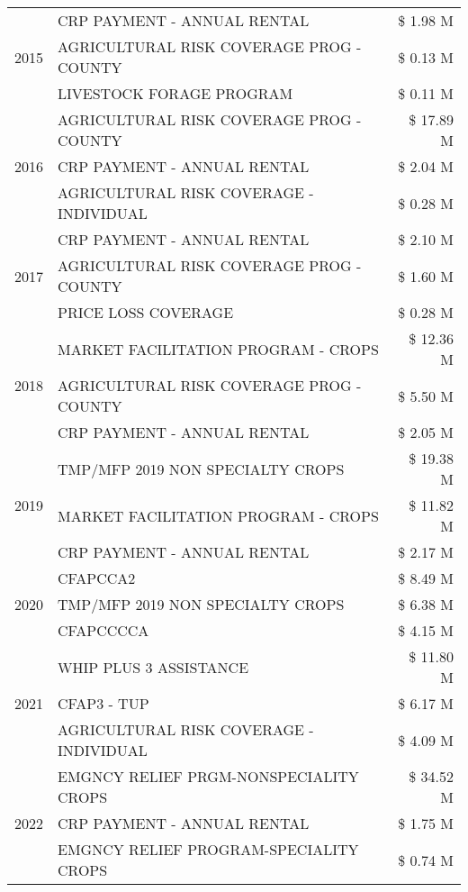 \begin{tabular}{llr}
\cline{1-3}
\multirow[t]{3}{*}{2015} & CRP PAYMENT - ANNUAL RENTAL & \$ 1.98 M \\
 & AGRICULTURAL RISK COVERAGE PROG - COUNTY & \$ 0.13 M \\
 & LIVESTOCK FORAGE PROGRAM & \$ 0.11 M \\
\cline{1-3}
\multirow[t]{3}{*}{2016} & AGRICULTURAL RISK COVERAGE PROG - COUNTY & \$ 17.89 M \\
 & CRP PAYMENT - ANNUAL RENTAL & \$ 2.04 M \\
 & AGRICULTURAL RISK COVERAGE - INDIVIDUAL & \$ 0.28 M \\
\cline{1-3}
\multirow[t]{3}{*}{2017} & CRP PAYMENT - ANNUAL RENTAL & \$ 2.10 M \\
 & AGRICULTURAL RISK COVERAGE PROG - COUNTY & \$ 1.60 M \\
 & PRICE LOSS COVERAGE & \$ 0.28 M \\
\cline{1-3}
\multirow[t]{3}{*}{2018} & MARKET FACILITATION PROGRAM - CROPS & \$ 12.36 M \\
 & AGRICULTURAL RISK COVERAGE PROG - COUNTY & \$ 5.50 M \\
 & CRP PAYMENT - ANNUAL RENTAL & \$ 2.05 M \\
\cline{1-3}
\multirow[t]{3}{*}{2019} & TMP/MFP 2019 NON SPECIALTY CROPS & \$ 19.38 M \\
 & MARKET FACILITATION PROGRAM - CROPS & \$ 11.82 M \\
 & CRP PAYMENT - ANNUAL RENTAL & \$ 2.17 M \\
\cline{1-3}
\multirow[t]{3}{*}{2020} & CFAPCCA2 & \$ 8.49 M \\
 & TMP/MFP 2019 NON SPECIALTY CROPS & \$ 6.38 M \\
 & CFAPCCCCA & \$ 4.15 M \\
\cline{1-3}
\multirow[t]{3}{*}{2021} & WHIP PLUS 3 ASSISTANCE & \$ 11.80 M \\
 & CFAP3 - TUP & \$ 6.17 M \\
 & AGRICULTURAL RISK COVERAGE - INDIVIDUAL & \$ 4.09 M \\
\cline{1-3}
\multirow[t]{3}{*}{2022} & EMGNCY RELIEF PRGM-NONSPECIALITY CROPS & \$ 34.52 M \\
 & CRP PAYMENT - ANNUAL RENTAL & \$ 1.75 M \\
 & EMGNCY RELIEF PROGRAM-SPECIALITY CROPS & \$ 0.74 M \\
\cline{1-3}
\bottomrule
\end{tabular}
